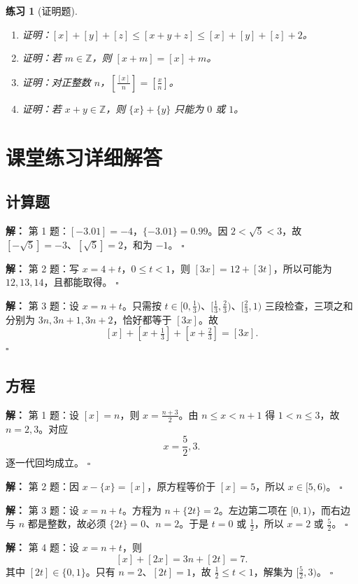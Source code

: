 \documentclass[11pt,a4paper,fontset=fandol]{ctexart}
\theoremstyle{formaltheorem}
\theoremstyle{formalexample}
\newtheorem{exercise}{练习}[section]
\newenvironment{solution}{\par\noindent\textbf{解：}}{\hfill$\square$\par}
\begin{document}
\begin{exercise}[证明题]
\begin{enumerate}
  \item 证明：$[x]+[y]+[z]\le[x+y+z]\le[x]+[y]+[z]+2$。
  \item 证明：若 $m\in\mathbb Z$，则 $[x+m]=[x]+m$。
  \item 证明：对正整数 $n$，$\displaystyle\left[\frac{[x]}n\right]=\left[\frac xn\right]$。
  \item 证明：若 $x+y\in\mathbb Z$，则 $\{x\}+\{y\}$ 只能为 $0$ 或 $1$。
\end{enumerate}
\end{exercise}

\section{课堂练习详细解答}
\subsection{计算题}
\begin{solution}
第 1 题：$[-3.01]=-4$，$\{-3.01\}=0.99$。因 $2<\sqrt5<3$，故 $[-\sqrt5]=-3$、$[\sqrt5]=2$，和为 $-1$。
\end{solution}
\begin{solution}
第 2 题：写 $x=4+t$，$0\le t<1$，则 $[3x]=12+[3t]$，所以可能为 $12,13,14$，且都能取得。
\end{solution}
\begin{solution}
第 3 题：设 $x=n+t$。只需按 $t\in[0,\frac13)$、$[\frac13,\frac23)$、$[\frac23,1)$ 三段检查，三项之和分别为 $3n,3n+1,3n+2$，恰好都等于 $[3x]$。故
\[
[x]+[x+\tfrac13]+[x+\tfrac23]=[3x].
\]
\end{solution}

\subsection{方程}
\begin{solution}
第 1 题：设 $[x]=n$，则 $x=\frac{n+3}{2}$。由 $n\le x<n+1$ 得 $1<n\le3$，故 $n=2,3$。对应
\[
x=\frac52,3.
\]
逐一代回均成立。
\end{solution}
\begin{solution}
第 2 题：因 $x-\{x\}=[x]$，原方程等价于 $[x]=5$，所以 $x\in[5,6)$。
\end{solution}
\begin{solution}
第 3 题：设 $x=n+t$。方程为 $n+\{2t\}=2$。左边第二项在 $[0,1)$，而右边与 $n$ 都是整数，故必须 $\{2t\}=0$、$n=2$。于是 $t=0$ 或 $\frac12$，所以 $x=2$ 或 $\frac52$。
\end{solution}
\begin{solution}
第 4 题：设 $x=n+t$，则
\[
[x]+[2x]=3n+[2t]=7.
\]
其中 $[2t]\in\{0,1\}$。只有 $n=2$、$[2t]=1$，故 $\frac12\le t<1$，解集为 $[\frac52,3)$。
\end{solution}
\end{document}
